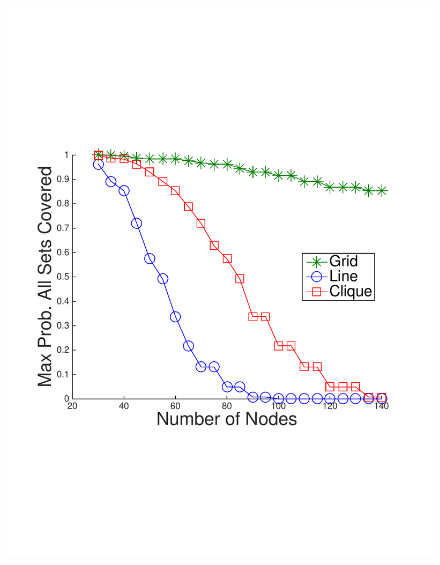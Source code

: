 \begin{figure}
{	\includegraphics[scale=0.22, clip=true, trim=14mm 65mm 25mm 65mm]{figures/use_cases_examples/cluster/cluster_cov_perc_vs_num_nodes_50_T_12_IS_2_W_color.pdf}
        \label{fig:use_case_sum_sim_vs_num_nodes}
        }
  \subfigure[Max N vs. Prob. All Sets Covered (Timeliness = 10)]{
}
\end{figure}
